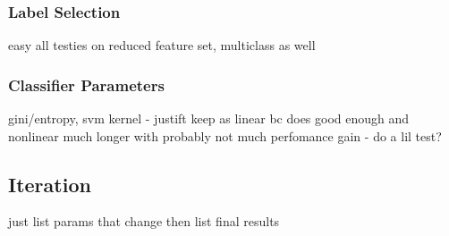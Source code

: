         \subsubsection{Label Selection}
        \label{subsubsec:exp-clf-opt-label}
            easy all testies on reduced feature set, multiclass as well
            
        \subsubsection{Classifier Parameters}
        \label{subsubsec:exp-clf-opt-param}
            gini/entropy, svm kernel  - justift keep as linear bc does good enough and nonlinear much longer with probably not much perfomance gain - do a lil test?
            
    \subsection{Iteration}
    \label{subsec:exp-clf-iter}
        just list params that change then list final results




            
    
    
